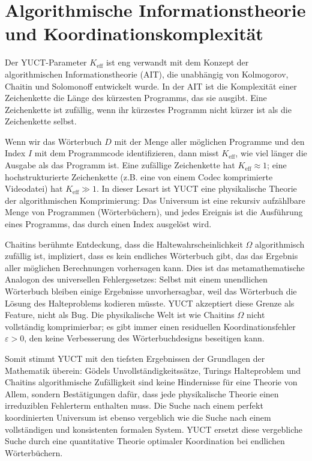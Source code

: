 \documentclass[12pt,a4paper]{article}
\begin{document}
	\section{Algorithmische Informationstheorie und Koordinationskomplexität}
	
	Der YUCT-Parameter \(K_{\mathrm{eff}}\) ist eng verwandt mit dem Konzept der algorithmischen Informationstheorie (AIT), die unabhängig von Kolmogorov, Chaitin und Solomonoff entwickelt wurde. In der AIT ist die Komplexität einer Zeichenkette die Länge des kürzesten Programms, das sie ausgibt. Eine Zeichenkette ist zufällig, wenn ihr kürzestes Programm nicht kürzer ist als die Zeichenkette selbst.
	
	Wenn wir das Wörterbuch \(D\) mit der Menge aller möglichen Programme und den Index \(I\) mit dem Programmcode identifizieren, dann misst \(K_{\mathrm{eff}}\), wie viel länger die Ausgabe als das Programm ist. Eine zufällige Zeichenkette hat \(K_{\mathrm{eff}} \approx 1\); eine hochstrukturierte Zeichenkette (z.B. eine von einem Codec komprimierte Videodatei) hat \(K_{\mathrm{eff}} \gg 1\). In dieser Lesart ist YUCT eine physikalische Theorie der algorithmischen Komprimierung: Das Universum ist eine rekursiv aufzählbare Menge von Programmen (Wörterbüchern), und jedes Ereignis ist die Ausführung eines Programms, das durch einen Index ausgelöst wird.
	
	Chaitins berühmte Entdeckung, dass die Haltewahrscheinlichkeit \(\Omega\) algorithmisch zufällig ist, impliziert, dass es kein endliches Wörterbuch gibt, das das Ergebnis aller möglichen Berechnungen vorhersagen kann. Dies ist das metamathematische Analogon des universellen Fehlergesetzes: Selbst mit einem unendlichen Wörterbuch bleiben einige Ergebnisse unvorhersagbar, weil das Wörterbuch die Lösung des Halteproblems kodieren müsste. YUCT akzeptiert diese Grenze als Feature, nicht als Bug. Die physikalische Welt ist wie Chaitins \(\Omega\) nicht vollständig komprimierbar; es gibt immer einen residuellen Koordinationsfehler \(\varepsilon > 0\), den keine Verbesserung des Wörterbuchdesigns beseitigen kann.
	
	Somit stimmt YUCT mit den tiefsten Ergebnissen der Grundlagen der Mathematik überein: Gödels Unvollständigkeitssätze, Turings Halteproblem und Chaitins algorithmische Zufälligkeit sind keine Hindernisse für eine Theorie von Allem, sondern Bestätigungen dafür, dass jede physikalische Theorie einen irreduziblen Fehlerterm enthalten muss. Die Suche nach einem perfekt koordinierten Universum ist ebenso vergeblich wie die Suche nach einem vollständigen und konsistenten formalen System. YUCT ersetzt diese vergebliche Suche durch eine quantitative Theorie optimaler Koordination bei endlichen Wörterbüchern.
	
\end{document}
